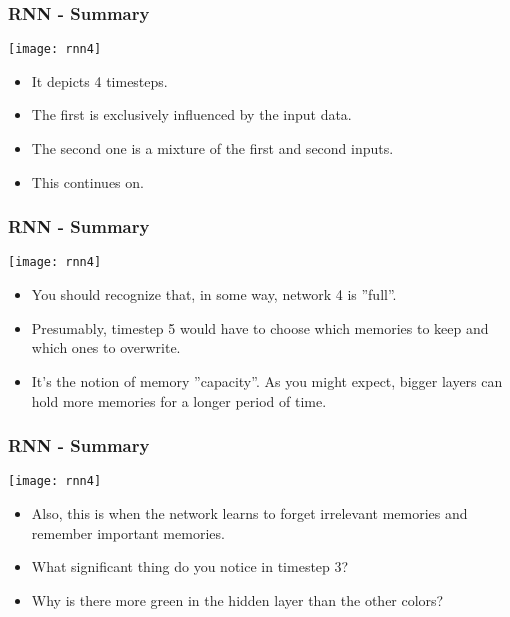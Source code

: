 \begin{frame}[fragile] \frametitle{RNN - Summary}
\begin{center}
\texttt{[image: rnn4]}
\end{center}
\begin{itemize}
\item It depicts 4 timesteps. 
\item The first is exclusively influenced by the input data. 
\item The second one is a mixture of the first and second inputs. 
\item This continues on. 
\end{itemize}
\end{frame}

\begin{frame}[fragile] \frametitle{RNN - Summary}
\begin{center}
\texttt{[image: rnn4]}
\end{center}
\begin{itemize}
\item You should recognize that, in some way, network 4 is ''full''. 
\item Presumably, timestep 5 would have to choose which memories to keep and which ones to overwrite. 
\item It's the notion of memory ''capacity''. As you might expect, bigger layers can hold more memories for a longer period of time.
\end{itemize}
\end{frame}

\begin{frame}[fragile] \frametitle{RNN - Summary}
\begin{center}
\texttt{[image: rnn4]}
\end{center}
\begin{itemize}
\item Also, this is when the network learns to forget irrelevant memories and remember important memories. 
\item What significant thing do you notice in timestep 3? 
\item Why is there more green in the hidden layer than the other colors?
\end{itemize}
\end{frame}

